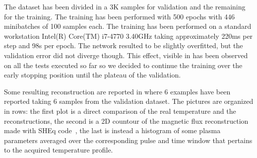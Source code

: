 The dataset has been divided in a 3K samples for validation and the remaining for the training. The training has been performed with 500 epochs with 446 minibatches of 100 samples each. The training has been performed on a standard workstation Intel(R) Core(TM) i7-4770 3.40GHz taking approximately 220ms per step and 98s per epoch. The network resulted to be slightly overfitted, but the validation error did not diverge though. This effect, visible in \Figure{\ref{fig:step_12_7_p}} has been observed on all the tests executed so far so we decided to continue the training over the early stopping position until the plateau of the validation.

Some resulting reconstruction are reported in \Figure{\ref{fig:Step_12_val}} where 6 examples have been reported taking 6 samples from the validation dataset. The pictures are organized in rows: the first plot is a direct comparison of the real temperature and the reconstructions, the second is a 2D countour of the magnetic flux reconstruction made with SHEq code~\cite{Martines_2011}, the last is instead a histogram of some plasma parameters averaged over the corresponding pulse and time window that pertains to the acquired temperature profile.
%
